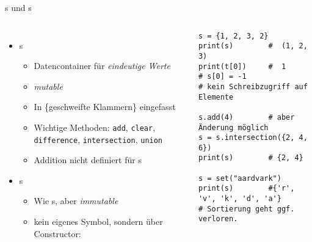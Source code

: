 \begin{frame}[fragile]{s und s}
%
\begin{columns}[T]
\begin{itemize}
\item {}s
	\begin{itemize}
	\item Datencontainer für \emph{eindeutige Werte}
	\item \emph{mutable}
	\item In \{geschweifte Klammern\} eingefasst
	\item Wichtige Methoden: \texttt{add}, \texttt{clear}, \texttt{difference}, \texttt{intersection}, \texttt{union}
	\item Addition nicht definiert für s
	\end{itemize}
\item {}s
	\begin{itemize}
	\item Wie s, aber \emph{immutable}
	\item kein eigenes Symbol, sondern über Constructor: 
	\end{itemize}
\end{itemize}
%
\begin{codebox}
\begin{verbatim}
s = {1, 2, 3, 2}
print(s)        #  (1, 2, 3)
print(t[0])     #  1
# s[0] = -1     
# kein Schreibzugriff auf Elemente

s.add(4)        # aber Änderung möglich
s = s.intersection({2, 4, 6})
print(s)        # {2, 4}

s = set("aardvark")
print(s)        #{'r', 'v', 'k', 'd', 'a'}
# Sortierung geht ggf. verloren.
\end{verbatim}
\end{codebox}
\end{columns}
%
\end{frame}


